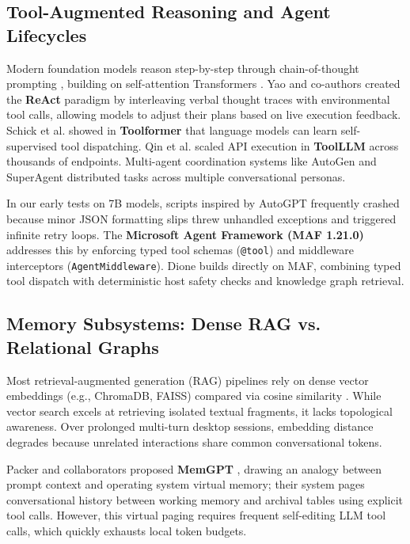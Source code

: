 \documentclass[conference,a4paper]{IEEEtran}
\begin{document}
\subsection{Tool-Augmented Reasoning and Agent Lifecycles}
Modern foundation models reason step-by-step through chain-of-thought prompting \cite{wei2022chain}, building on self-attention Transformers \cite{vaswani2017attention}. Yao and co-authors created the \textbf{ReAct} paradigm \cite{yao2023react} by interleaving verbal thought traces with environmental tool calls, allowing models to adjust their plans based on live execution feedback. Schick et al. showed in \textbf{Toolformer} \cite{schick2023toolformer} that language models can learn self-supervised tool dispatching. Qin et al. scaled API execution in \textbf{ToolLLM} \cite{qin2023toolllm} across thousands of endpoints. Multi-agent coordination systems like AutoGen \cite{dibia2023autogen} and SuperAgent \cite{malsuare2024superagent} distributed tasks across multiple conversational personas.

In our early tests on 7B models, scripts inspired by AutoGPT \cite{liu2023agentbench} frequently crashed because minor JSON formatting slips threw unhandled exceptions and triggered infinite retry loops. The \textbf{Microsoft Agent Framework (MAF 1.21.0)} \cite{microsoft2025agentframework} addresses this by enforcing typed tool schemas (\texttt{@tool}) and middleware interceptors (\texttt{AgentMiddleware}). Dione builds directly on MAF, combining typed tool dispatch with deterministic host safety checks and knowledge graph retrieval.

\subsection{Memory Subsystems: Dense RAG vs. Relational Graphs}
Most retrieval-augmented generation (RAG) pipelines rely on dense vector embeddings (e.g., ChromaDB, FAISS) compared via cosine similarity \cite{lewis2020retrieval}. While vector search excels at retrieving isolated textual fragments, it lacks topological awareness. Over prolonged multi-turn desktop sessions, embedding distance degrades because unrelated interactions share common conversational tokens.

Packer and collaborators proposed \textbf{MemGPT} \cite{packer2023memgpt}, drawing an analogy between prompt context and operating system virtual memory; their system pages conversational history between working memory and archival tables using explicit tool calls. However, this virtual paging requires frequent self-editing LLM tool calls, which quickly exhausts local token budgets.
\end{document}
